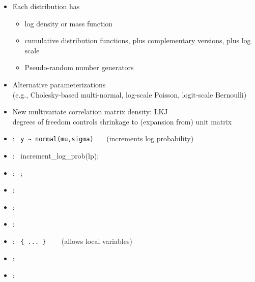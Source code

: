 \documentclass[10pt]{report}
\begin{document}

\begin{itemize}
\item Each distribution has
  \vspace*{-4pt}
  \begin{itemize}\small
  \item log density or mass function
  \item cumulative distribution functions, plus complementary versions,
    plus log scale
  \item Pseudo-random number generators
  \end{itemize}
\item Alternative parameterizations
  \\
  {\footnotesize (e.g., Cholesky-based multi-normal,
    log-scale Poisson, logit-scale Bernoulli)}
\item New multivariate correlation matrix density: LKJ
  \\
  {\footnotesize degrees of freedom controls 
    shrinkage to (expansion from) unit matrix}
\end{itemize}

\vspace*{-4pt}
\begin{itemize}
\item {}: \ {\footnotesize \Verb|y ~ normal(mu,sigma)|}
  \ \ \ {\footnotesize (increments log probability)}
\item {}: \ {\footnotesize increment\_log\_prob(lp);}
\item {}: \  {\footnotesize {};}
\item {}: \ {\footnotesize {}}
\item {}: \ {\footnotesize {}}
\item {}: \ {\footnotesize
    }
\item {}: \ {\footnotesize \Verb|{ ... }|}  \ \ \ {\footnotesize
    (allows local variables)}
\item {}: \ {\footnotesize {}}
\item {}: 
\ {\footnotesize 
    }
\end{itemize}
\end{document}
